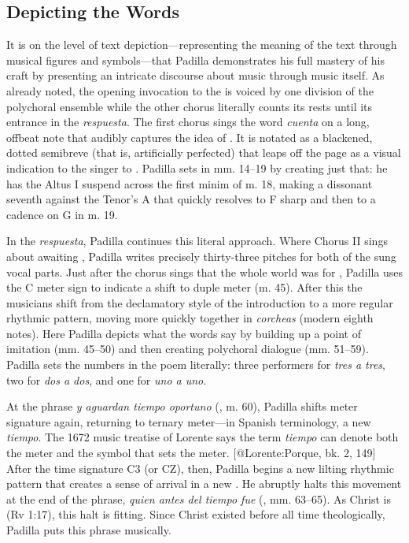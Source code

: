 \subsection{Depicting the Words}

It is on the level of text depiction---representing the meaning of the text
through musical figures and symbols---that Padilla demonstrates his full mastery
of his craft by presenting an intricate discourse about music through music
itself.
As already noted, the opening invocation to the  is voiced by one division of the polychoral
ensemble while the other chorus literally counts its rests until its entrance in
the \emph{respuesta}.
The first chorus sings the word \emph{cuenta} on a long, offbeat note that audibly
captures the idea of .
It is notated as a blackened, dotted semibreve (that is, artificially perfected)
that leaps off the page as a visual indication to the singer to .
Padilla sets  in mm. 14--19 by creating just that: he
has the Altus I suspend across the first minim of m. 18, making a dissonant
seventh against the Tenor's A that quickly resolves to F sharp and then to a
cadence on G in m. 19.

In the \emph{respuesta}, Padilla continues this literal approach.
Where Chorus II sings about awaiting , Padilla writes
precisely thirty-three pitches for both of the sung vocal parts.
Just after the chorus sings that the whole world was  for , Padilla uses the C meter sign to indicate a shift to duple meter (m. 45).
After this the musicians shift from the declamatory style of the introduction to
a more regular rhythmic pattern, moving more quickly together in \emph{corcheas}
(modern eighth notes).
Here Padilla depicts what the words say by building up a point of imitation
 (mm. 45--50) and then creating polychoral dialogue
(mm. 51--59).
Padilla sets the numbers in the poem literally: three performers for
\emph{tres a tres}, two for \emph{dos a dos}, and one for \emph{uno a uno}.

At the phrase \emph{y aguardan tiempo oportuno} (,
m. 60), Padilla shifts meter signature again, returning to ternary meter---in
Spanish terminology, a new \emph{tiempo}.
The 1672 music treatise of Lorente says the term \emph{tiempo} can denote both the
meter and the symbol that sets the meter.
[@Lorente:Porque, bk. 2, 149]
After the time signature C3 (or CZ), then, Padilla begins a new lilting rhythmic
pattern that creates a sense of arrival in a new .
He abruptly halts this movement at the end of the phrase, \emph{quien antes del
tiempo fue} (, mm. 63--65).
As Christ is  (Rv 1:17), this halt is fitting.
Since Christ existed before all time theologically, Padilla puts this phrase
 musically.

